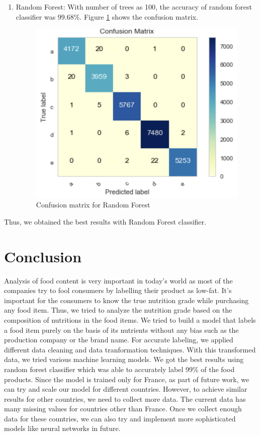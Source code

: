 \documentclass[sigconf]{acmart}
\begin{document}
\begin{enumerate}
  \item Random Forest: With number of trees as 100, the accuracy of random forest classifier was 99.68\%. Figure \ref{fig:Fig6} shows the confusion matrix. \\

\begin{figure}
\includegraphics[width=1.0\textwidth]{images/fig6.png}
\caption{Confusion matrix for Random Forest \cite{code-base}}
\label{fig:Fig6}
\end{figure}

\end{enumerate}

Thus, we obtained the best results with Random Forest classifier.

\section{Conclusion}
Analysis of food content is very important in today's world as most of the companies try to fool consumers by labelling their product as low-fat. It's important for the consumers to know the true nutrition grade while purchasing any food item. Thus, we tried to analyze the nutrition grade based on the composition of nutritions in the food items. We tried to build a model that labels a food item purely on the basis of its nutrients without any bias such as the production company or the brand name. For accurate labeling, we applied different data cleaning and data tranformation techniques. With this transformed data, we tried various machine learning models. We got the best results using random forest classifier which was able to accurately label 99\% of the food products. Since the model is trained only for France, as part of future work, we can try and scale our model for different countries. However, to achieve similar results for other countries, we need to collect more data. The current data has many missing values for countries other than France. Once we collect enough data for these countries, we can also try and implement more sophisticated models like neural networks in future.
\end{document}

